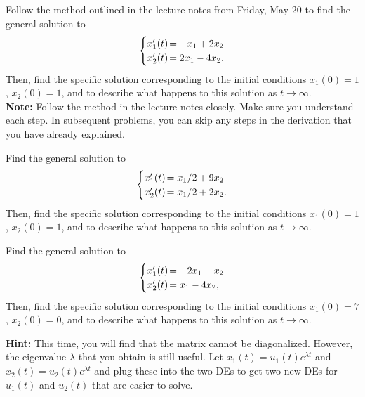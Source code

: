 \documentclass[boxes]{gsypset}
\begin{document}
\begin{problem}
	Follow the method outlined in the lecture notes from Friday, May 20 to find the general solution to
	\[
		\begin{cases}
			x_1'(t)&\hspace{-.12in}=-x_1+2x_2\\
			x_2'(t)&\hspace{-.12in}=2x_1-4x_2.
		\end{cases}
	\]
	Then, find the specific solution corresponding to the initial
	conditions $x_1(0)=1$, $x_2(0)=1$, and to describe what happens to this
	solution as $t\to\infty$.\\
	
	\textbf{Note:} Follow the method in the lecture notes closely. 
	Make sure you understand each step. 
	In subsequent problems, you can skip any steps in the derivation that you have already explained.
\end{problem}
\begin{solution}
	
\end{solution}

\begin{problem}
	Find the general solution to
	\[
		\begin{cases}
			x_1'(t)&\hspace{-.12in}=x_1/2+9x_2\\
			x_2'(t)&\hspace{-.12in}=x_1/2+2x_2.
		\end{cases}
	\]
	Then, find the specific solution corresponding to the initial
	conditions $x_1(0)=1$, $x_2(0)=1$, and to describe what happens to this
	solution as $t\to\infty$.
\end{problem}
\begin{solution}
	
\end{solution}

\begin{problem}
	Find the general solution to
	\[
		\begin{cases}
			x_1'(t)&\hspace{-.12in}=-2x_1-x_2\\
			x_2'(t)&\hspace{-.12in}=x_1-4x_2, 
		\end{cases}
	\]
	Then, find the specific solution corresponding to the initial
	conditions $x_1(0)=7$, $x_2(0)=0$, and to describe what happens to this
	solution as $t\to\infty$.
	
	\textbf{Hint:} This time, you will find that the matrix cannot be diagonalized. 
	However, the eigenvalue $\lambda$ that you obtain is still useful. 
	Let $x_1(t)=u_1(t)e^{\lambda t}$ and $x_2(t)=u_2(t)e^{\lambda t}$ and 
	plug these into the two DEs to get two new DEs for $u_1(t)$ and $u_2(t)$ that are easier to solve.
\end{problem}
\begin{solution}
	
\end{solution}
\end{document}
